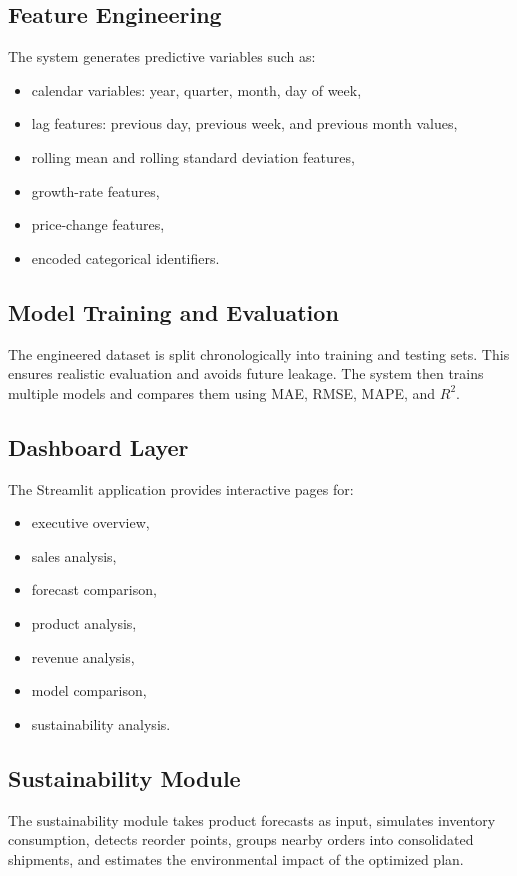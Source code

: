 \documentclass[12pt,a4paper]{article}
\begin{document}
\subsection{Feature Engineering}
The system generates predictive variables such as:
\begin{itemize}[leftmargin=*]
    \item calendar variables: year, quarter, month, day of week,
    \item lag features: previous day, previous week, and previous month values,
    \item rolling mean and rolling standard deviation features,
    \item growth-rate features,
    \item price-change features,
    \item encoded categorical identifiers.
\end{itemize}

\subsection{Model Training and Evaluation}
The engineered dataset is split chronologically into training and testing sets. This ensures realistic evaluation and avoids future leakage. The system then trains multiple models and compares them using MAE, RMSE, MAPE, and $R^2$.

\subsection{Dashboard Layer}
The Streamlit application provides interactive pages for:
\begin{itemize}[leftmargin=*]
    \item executive overview,
    \item sales analysis,
    \item forecast comparison,
    \item product analysis,
    \item revenue analysis,
    \item model comparison,
    \item sustainability analysis.
\end{itemize}

\subsection{Sustainability Module}
The sustainability module takes product forecasts as input, simulates inventory consumption, detects reorder points, groups nearby orders into consolidated shipments, and estimates the environmental impact of the optimized plan.
\end{document}
